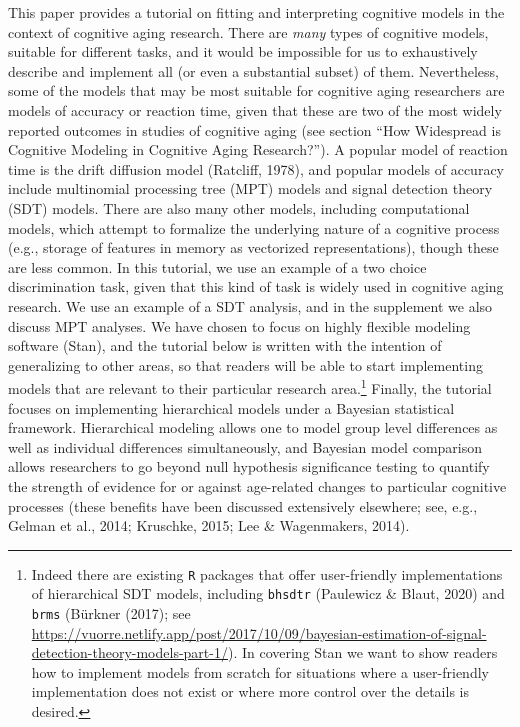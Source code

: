 \documentclass[
  english,
  ,man,floatsintext]{apa6}
\begin{document}
This paper provides a tutorial on fitting and interpreting cognitive models in the context of cognitive aging research. There are \emph{many} types of cognitive models, suitable for different tasks, and it would be impossible for us to exhaustively describe and implement all (or even a substantial subset) of them. Nevertheless, some of the models that may be most suitable for cognitive aging researchers are models of accuracy or reaction time, given that these are two of the most widely reported outcomes in studies of cognitive aging (see section \enquote{How Widespread is Cognitive Modeling in Cognitive Aging Research?}). A popular model of reaction time is the drift diffusion model (Ratcliff, 1978), and popular models of accuracy include multinomial processing tree (MPT) models and signal detection theory (SDT) models. There are also many other models, including computational models, which attempt to formalize the underlying nature of a cognitive process (e.g., storage of features in memory as vectorized representations), though these are less common. In this tutorial, we use an example of a two choice discrimination task, given that this kind of task is widely used in cognitive aging research. We use an example of a SDT analysis, and in the supplement we also discuss MPT analyses. We have chosen to focus on highly flexible modeling software (Stan), and the tutorial below is written with the intention of generalizing to other areas, so that readers will be able to start implementing models that are relevant to their particular research area.\footnote{Indeed there are existing \texttt{R} packages that offer user-friendly implementations of hierarchical SDT models, including \texttt{bhsdtr} (Paulewicz \& Blaut, 2020) and \texttt{brms} (Bürkner (2017); see \url{https://vuorre.netlify.app/post/2017/10/09/bayesian-estimation-of-signal-detection-theory-models-part-1/}). In covering Stan we want to show readers how to implement models from scratch for situations where a user-friendly implementation does not exist or where more control over the details is desired.} Finally, the tutorial focuses on implementing hierarchical models under a Bayesian statistical framework. Hierarchical modeling allows one to model group level differences as well as individual differences simultaneously, and Bayesian model comparison allows researchers to go beyond null hypothesis significance testing to quantify the strength of evidence for or against age-related changes to particular cognitive processes (these benefits have been discussed extensively elsewhere; see, e.g., Gelman et al., 2014; Kruschke, 2015; Lee \& Wagenmakers, 2014).
\end{document}
